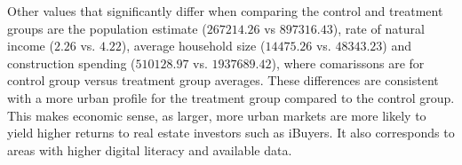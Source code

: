Other values that significantly differ when comparing the control and treatment groups are the population estimate ($267214.26$ vs $897316.43$), rate of natural income ($2.26$ vs. $4.22$), average household size ($14475.26$ vs. $48343.23$) and construction spending ($510128.97$ vs. $1937689.42$), where comarissons are for control group versus treatment group averages. These differences are consistent with a more urban profile for the treatment group compared to the control group. This makes economic sense, as larger, more urban markets are more likely to yield higher returns to real estate investors such as iBuyers. It also corresponds to areas with higher digital literacy and available data.
